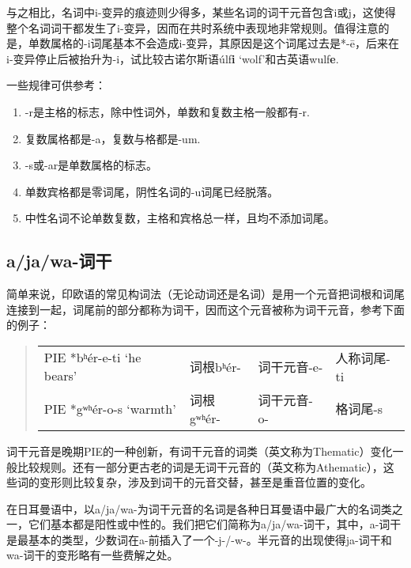 与之相比，名词中i-变异的痕迹则少得多，某些名词的词干元音包含i或j，这使得整个名词词干都发生了i-变异，因而在共时系统中表现地非常规则。值得注意的是，单数属格的-i词尾基本不会造成i-变异，其原因是这个词尾过去是*-ē，后来在i-变异停止后被抬升为-i，试比较古诺尔斯语úlf\textbf{i}
`wolf'和古英语wulf\textbf{e}.

一些规律可供参考：

\begin{info}
  \begin{enumerate}[1.]
    \item -r是主格的标志，除中性词外，单数和复数主格一般都有-r.
    \item 复数属格都是-a，复数与格都是-um.
    \item -s或-ar是单数属格的标志。
    \item 单数宾格都是零词尾，阴性名词的-u词尾已经脱落。
    \item 中性名词不论单数复数，主格和宾格总一样，且均不添加词尾。


  \end{enumerate}
\end{info}

\subsection{a/ja/wa-词干}
\label{a/ja/wa-词干}

简单来说，印欧语的常见构词法（无论动词还是名词）是用一个元音把词根和词尾连接到一起，词尾前的部分都称为词干，因而这个元音被称为词干元音，参考下面的例子：

\begin{quote}
  \begin{tabular}{llll}
    PIE *bʰér-e-ti `he bears' & 词根bʰér-  & 词干元音-e- & 人称词尾-ti \\
    PIE *gʷʰér-o-s `warmth'   & 词根gʷʰér- & 词干元音-o- & 格词尾-s
  \end{tabular}
\end{quote}

词干元音是晚期PIE的一种创新，有词干元音的词类（英文称为Thematic）变化一般比较规则。还有一部分更古老的词是无词干元音的（英文称为Athematic），这些词的变形则比较复杂，涉及到词干的元音交替，甚至是重音位置的变化。

在日耳曼语中，以a/ja/wa-为词干元音的名词是各种日耳曼语中最广大的名词类之一，它们基本都是阳性或中性的。我们把它们简称为a/ja/wa-词干，其中，a-词干是最基本的类型，少数词在a-前插入了一个-j-/-w-。半元音的出现使得ja-词干和wa-词干的变形略有一些费解之处。


